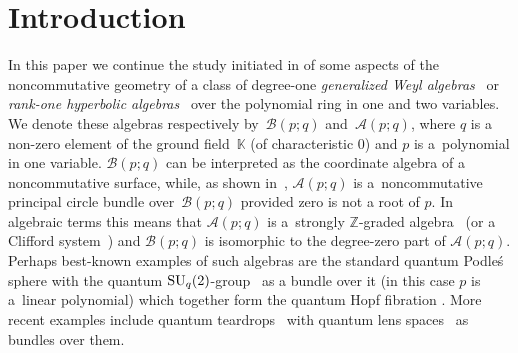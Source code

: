 \documentclass[pdftex]{sigma}
\numberwithin{equation}{section}
\def\Weyl#1#2{{\mathcal{B}}(#1;#2)}
\def\AWeyl#1#2{{\mathcal{A}}(#1;#2)}
\begin{document}


\section{Introduction}\label{sec.intro}
In this paper we continue the study initiated in \cite{Brz:gen} of some aspects of the noncommutative geo\-met\-ry of a class of degree-one {\em generalized Weyl algebras}~\cite{Bav:gweyl} or {\em rank-one hyperbolic algebras}~\cite{LunRos:Kas} over the polynomial ring in one and two variables. We denote these algebras respectively by~$\Weyl p q$ and~$\AWeyl p q$, where $q$ is a non-zero element of the ground f\/ield~${\mathbb K}$ (of characteristic 0) and $p$ is a~polynomial in one variable. $\Weyl p q$ can be interpreted as the coordinate algebra of a noncommutative surface, while, as shown in~\cite{Brz:gen}, $\AWeyl p q$ is a~noncommutative principal circle bundle over~$\Weyl p q$ provided zero is not a root of $p$. In algebraic terms this means that $\AWeyl p q$ is a~strongly ${\mathbb Z}$-graded algebra~\cite{Dad:gro} (or a Clif\/ford system~\cite{Dad:com}) and $\Weyl p q$ is isomorphic to the degree-zero part of $\AWeyl p q$. Perhaps best-known examples of such algebras are the standard quantum Podle\'s sphere \cite{Pod:sph} with the quantum ${\rm SU}_q(2)$-group~\cite{Wor:com} as a bundle over it (in this case $p$ is a~linear polynomial) which together form the quantum Hopf f\/ibration \cite{BrzMaj:gau}. More recent examples include quantum teardrops~\cite{BrzFai:tea} with quantum lens spaces~\cite{HonSzy:len} as bundles over them.
\end{document}
